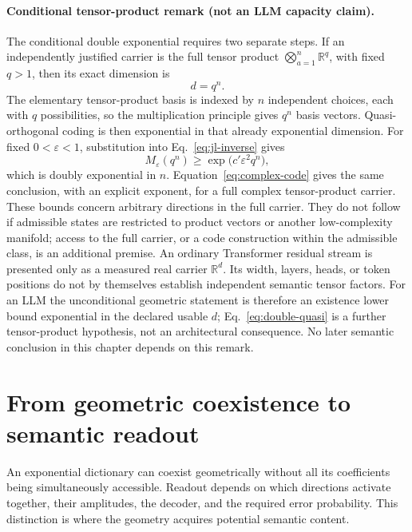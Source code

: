 \documentclass[
  aps,
  reprint,
  superscriptaddress,
  floatfix,
  nofootinbib,
  longbibliography
]{revtex4-2}
\newcommand{\R}{\mathbb{R}}
\begin{document}
\paragraph{Conditional tensor-product remark (not an LLM capacity claim).}
The conditional double exponential requires two separate steps.  If
an independently justified carrier is the full tensor product
$\bigotimes_{a=1}^{n}\R^q$, with fixed $q>1$, then its exact dimension is
\begin{equation}
\label{eq:product-dimension}
d=q^n.
\end{equation}
The elementary tensor-product basis is indexed by $n$ independent choices,
each with $q$ possibilities, so the multiplication principle gives $q^n$
basis vectors.  Quasi-orthogonal coding is then exponential in that already
exponential dimension.
For fixed $0<\varepsilon<1$, substitution into Eq.~\eqref{eq:jl-inverse} gives
\begin{equation}
\label{eq:double-quasi}
M_\varepsilon(q^n)
\geq
\exp\!\bigl(c'\varepsilon^2q^n\bigr),
\end{equation}
which is doubly exponential in $n$.  Equation~\eqref{eq:complex-code} gives
the same conclusion, with an explicit exponent, for a full complex
tensor-product carrier.  These bounds concern arbitrary directions in the
full carrier.  They do not follow if admissible states are restricted to
product vectors or another low-complexity manifold; access to the full carrier,
or a code construction within the admissible class, is an additional premise.
An ordinary Transformer residual stream is presented only as a measured real
carrier $\R^d$.  Its width, layers, heads, or token positions do not by
themselves establish independent semantic tensor factors.  For an LLM the
unconditional geometric statement is therefore an existence lower bound
exponential in the declared usable $d$; Eq.~\eqref{eq:double-quasi} is a
further tensor-product hypothesis, not an architectural consequence.  No later semantic conclusion in this
chapter depends on this remark.

\section{From geometric coexistence to semantic readout}
\label{sec:dictionary-readout}

An exponential dictionary can coexist geometrically without all its
coefficients being simultaneously accessible.  Readout depends on which
directions activate together, their amplitudes, the decoder, and the required
error probability.  This distinction is where the geometry acquires
potential semantic content.
\end{document}
